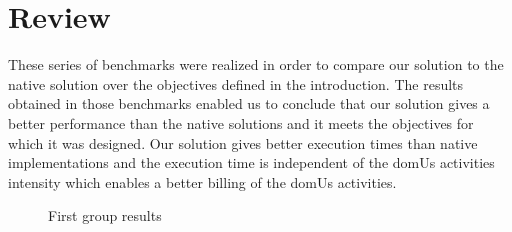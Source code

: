 \section{Review}

These series of benchmarks were realized in order to compare our solution to the native solution over the objectives defined in the introduction. The results obtained in those benchmarks enabled us to conclude that our solution gives a better performance than the native solutions and it meets the objectives for which it was designed. Our solution gives better execution times than native implementations and the execution time is independent of the domUs activities intensity which enables a better billing of the domUs activities. 


\begin{figure}[!h]
\begin{minipage}[b]{.5\linewidth}
\centering 
\label{fig:eval1}
\end{minipage}
\begin{minipage}[b]{.5\linewidth}
\centering 
\label{fig:eval2}
\end{minipage}
\caption{First group results}
\end{figure}


